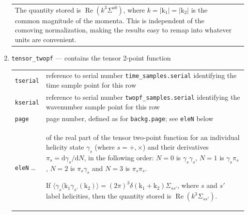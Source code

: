 \documentclass[11pt,a4paper]{article}
\renewcommand{\d}{\mathrm{d}}
\newcommand{\vect}[1]{\bm{\mathrm{{#1}}}}
\newcommand{\semibold}[1]{{\fontseries{b}\selectfont{#1}}}
\newenvironment{sqltablelist}{\renewcommand{\arraystretch}{1.3}\small}{}
\DeclareMathOperator{\realpart}{Re}
\renewcommand{\Re}{\realpart}
\begin{document}
\begin{sqltablelist}
\begin{enumerate}
\begin{tabular}{p{2.5cm}p{11.2cm}}
        The quantity stored is $\Re(k^3 \Sigma^{ab})$, where $k = |\vect{k}_1| = |\vect{k}_2|$
        is the common magnitude of the momenta.
        This is independent of the comoving normalization, making the results
        easy to remap into whatever units are convenient.
    \end{tabular}
    
    \item \texttt{tensor_twopf} --- contains the tensor 2-point function \\
    \begin{tabular}{p{2.5cm}p{11.2cm}}
        \texttt{tserial} & reference to serial number
        \texttt{time_samples.serial} identifying the time sample point for this row \\
        \texttt{kserial} & reference to serial number
        \texttt{twopf_samples.serial} identifying the wavenumber sample point for this row \\
        \texttt{page} & page number, defined as for \texttt{backg.page}; see
        \texttt{eleN} below \\
        \texttt{eleN} \ldots & \semibold{dimensionless components}
        of the real part of the tensor two-point function
        for an individual helicity state $\gamma_s$ (where $s = +, \times$)
        and their derivatives $\pi_s = \d \gamma_s / \d N$,
        in the following order:
        $N = 0$ is $\gamma_s \gamma_s$,
        $N = 1$ is $\gamma_s \pi_s$,
        $N = 2$ is $\pi_s \gamma_s$
        and $N = 3$ is $\pi_s \pi_s$.

        If $\langle \gamma_s(\vect{k}_1 \gamma_{s'}(\vect{k}_2) \rangle =
        (2\pi)^3 \delta(\vect{k}_1 + \vect{k}_2) \Sigma_{ss'}$,
        where $s$ and $s'$ label helicities,
        then the quantity stored is
        $\Re(k^3 \Sigma_{ss'})$.
    \end{tabular}


\end{enumerate}
\end{sqltablelist}
\end{document}
